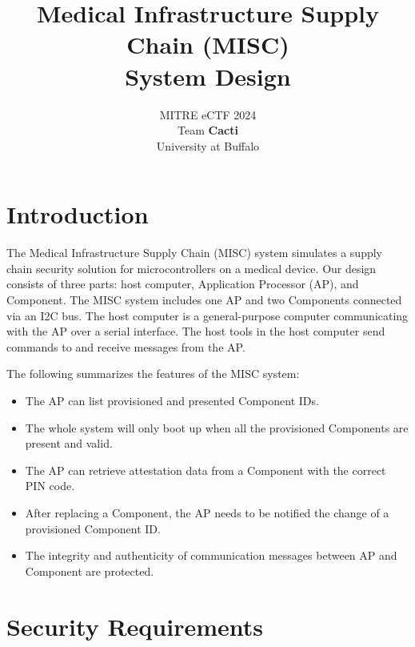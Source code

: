 \documentclass[11pt,oneside,onecolumn,letterpaper]{article}
\title{Medical Infrastructure Supply Chain (MISC) \\ System Design}
\author{MITRE eCTF 2024\\Team \textbf{Cacti}\\ University at Buffalo}
\date{}
\begin{document}
	\normalsize
	
	
	\maketitle
	
	\renewcommand{\thepage}{System Design, Team Cacti, University at Buffalo--\arabic{page}}
	\setcounter{page}{1} \normalsize
	
	\newcommand{\flagRollback}{\textsf{Rollback}\xspace}
	
	\section{Introduction}
	The Medical Infrastructure Supply Chain (MISC) system simulates a supply chain security solution for microcontrollers on a medical device.
	Our design consists of three parts: host computer, Application Processor (AP), and Component.
	The MISC system includes one AP and two Components connected via an I2C bus.
	The host computer is a general-purpose computer communicating with the AP over a serial interface.
	The host tools in the host computer send commands to and receive messages from the AP.
	
	The following summarizes the features of the MISC system:
	\begin{itemize}
		\item The AP can list provisioned and presented Component IDs.
		\item The whole system will only boot up when all the provisioned Components are present and valid.
		\item The AP can retrieve attestation data from a Component with the correct PIN code.
		\item After replacing a Component,
		the AP needs to be notified the change of a provisioned Component ID.
		\item The integrity and authenticity of communication messages between AP and Component are protected.
	\end{itemize}
	
	\section{Security Requirements}
	
\end{document}
